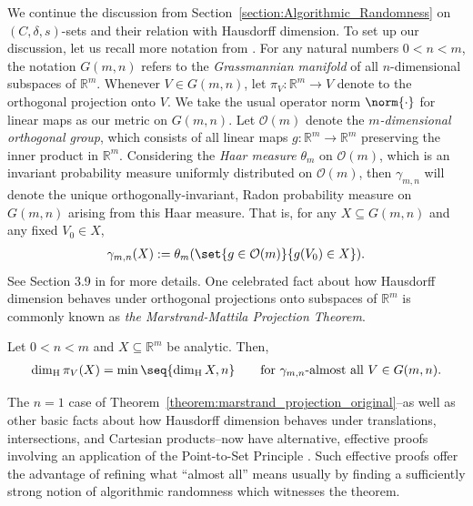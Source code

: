 We continue the discussion from Section~\ref{section:Algorithmic_Randomness} on $(C, \delta, s)$-sets and their relation with Hausdorff dimension. To set up our discussion, let us recall more notation from \cite{Mat95}. For any natural numbers $0 < n < m$, the notation $G(m, n)$ refers to the \textit{Grassmannian manifold} of all $n$-dimensional subspaces of $\mathbb{R}^m$. Whenever $V \in G(m, n)$, let $\pi_V : \mathbb{R}^m \to V$ denote to the orthogonal projection onto $V$. We take the usual operator norm $\norm{\cdot}$ for linear maps as our metric on $G(m, n)$. Let $\mathcal{O}(m)$ denote the \textit{$m$-dimensional orthogonal group}, which consists of all linear maps $g : \mathbb{R}^m \to \mathbb{R}^m$ preserving the inner product in $\mathbb{R}^m$. Considering the \textit{Haar measure} $\theta_m$ on $\mathcal{O}(m)$, which is an invariant probability measure uniformly distributed on $\mathcal{O}(m)$, then $\gamma_{m, n}$ will denote the unique orthogonally-invariant, Radon probability measure on $G(m, n)$ arising from this Haar measure. That is, for any $X \subseteq G(m, n)$ and any fixed $V_0 \in X$,
\begin{align*}
    \gamma_{m, n}(X) :=  \theta_m(\set{g \in \mathcal{O}(m)}{g(V_0) \in X}).
\end{align*}
See Section 3.9 in \cite{Mat95} for more details. One celebrated fact about how Hausdorff dimension behaves under orthogonal projections onto subspaces of $\mathbb{R}^m$ is commonly known as \textit{the Marstrand-Mattila Projection Theorem}.

\begin{theorem}
    \label{theorem:marstrand_projection_original}
    Let $0 < n < m$ and $X \subseteq \mathbb{R}^m$ be analytic. Then,
    \begin{align*}
        \dim_{\operatorname{H}} \pi_V(X) = \min \seq{\dim_{\operatorname{H}} X, n} \qquad \text{for $\gamma_{m, n}$-almost all $V \in G(m, n)$}.
    \end{align*}
\end{theorem}

The $n = 1$ case of Theorem~\ref{theorem:marstrand_projection_original}--as well as other basic facts about how Hausdorff dimension behaves under translations, intersections, and Cartesian products--now have alternative, effective proofs involving an application of the Point-to-Set Principle \cite{LS17, Lut21}. Such effective proofs offer the advantage of refining what ``almost all'' means usually by finding a sufficiently strong notion of algorithmic randomness which witnesses the theorem.

